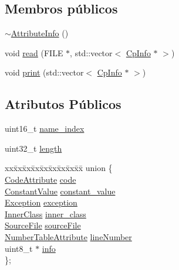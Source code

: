\subsection*{Membros públicos}
\begin{DoxyCompactItemize}
\item 
\hyperlink{class_attribute_info_a162f3e7ddffe46e9f49c16d801b8a801}{$\sim$\+Attribute\+Info} ()
\item 
void \hyperlink{class_attribute_info_ac167daa272a7ef9b9f11389d34e42165}{read} (F\+I\+LE $\ast$, std\+::vector$<$ \hyperlink{class_cp_info}{Cp\+Info} $\ast$ $>$)
\item 
void \hyperlink{class_attribute_info_ab9d036b005950e243e6375d49a533d58}{print} (std\+::vector$<$ \hyperlink{class_cp_info}{Cp\+Info} $\ast$ $>$)
\end{DoxyCompactItemize}
\subsection*{Atributos Públicos}
\begin{DoxyCompactItemize}
\item 
uint16\+\_\+t \hyperlink{class_attribute_info_a149c8bb83a448635fe1deb8d898c6efa}{name\+\_\+index}
\item 
uint32\+\_\+t \hyperlink{class_attribute_info_af2a071761e7f62eb240affb425c56896}{length}
\item 
\begin{tabbing}
xx\=xx\=xx\=xx\=xx\=xx\=xx\=xx\=xx\=\kill
union \{\\
\>\hyperlink{class_code_attribute}{CodeAttribute} \hyperlink{class_attribute_info_a8402afa8032becfaf9feeb3ac48fd503}{code}\\
\>\hyperlink{class_constant_value}{ConstantValue} \hyperlink{class_attribute_info_a250a7f39bbb2a2589dbf7bcdcf58639a}{constant\_value}\\
\>\hyperlink{class_exception}{Exception} \hyperlink{class_attribute_info_a72e793558ac34051d73771f94591c089}{exception}\\
\>\hyperlink{class_inner_class}{InnerClass} \hyperlink{class_attribute_info_aad26002c8512e7193a0963d21a20a7c4}{inner\_class}\\
\>\hyperlink{class_source_file}{SourceFile} \hyperlink{class_attribute_info_afcfcce1e1e4ea2a3461a00dd724847ac}{sourceFile}\\
\>\hyperlink{class_number_table_attribute}{NumberTableAttribute} \hyperlink{class_attribute_info_ac3d14ba1f8476677e0e48b856c678320}{lineNumber}\\
\>uint8\_t $\ast$ \hyperlink{class_attribute_info_a29031abd0ae7fd3a55950616e5368dd2}{info}\\
\}; \\

\end{tabbing}\end{DoxyCompactItemize}


